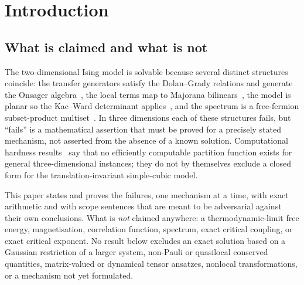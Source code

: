 \documentclass[11pt]{article}
\theoremstyle{definition}
\begin{document}
\begin{abstract}
The computational base is exact: the simple-cubic reduced free energy is computed to $v^{28}$ at high
temperature and $x^{56}$ at low temperature with per-box Chinese-remainder uniqueness certificates.
A deterministic $41{,}424$-state memory-$12$ walk automaton with an exact positive integer
Collatz certificate proves $\mu<4.747526$, and the critical coupling is therefore certified to lie in
$[0.2138368062108697304302094293879379891333,\,0.2527310098586630030260020266135701299926]$.
Every statement carries an explicit status tag, every universal claim is separated from the finite
computation that motivated it, and the withdrawn claims are listed as prominently as the proved ones.
\end{abstract}

\tableofcontents

\section{Introduction}

\subsection{What is claimed and what is not}
The two-dimensional Ising model is solvable because several distinct structures coincide: the
transfer generators satisfy the Dolan--Grady relations and generate the Onsager
algebra~\cite{dolangrady1982,davies1990_onsager,davies1991_onsager}, the local terms map to Majorana
bilinears~\cite{schultzmattisl1964}, the model is planar so the Kac--Ward determinant
applies~\cite{kacward1952}, and the spectrum is a free-fermion subset-product
multiset~\cite{onsager1944,kaufman1949}. In three dimensions each of these structures fails, but
``fails'' is a mathematical assertion that must be proved for a precisely stated mechanism, not
asserted from the absence of a known solution. Computational hardness results~\cite{istrail2000} say
that no efficiently computable partition function exists for general three-dimensional instances;
they do not by themselves exclude a closed form for the translation-invariant simple-cubic model.

This paper states and proves the failures, one mechanism at a time, with exact arithmetic and with
scope sentences that are meant to be adversarial against their own conclusions. What is
\emph{not} claimed anywhere: a thermodynamic-limit free energy, magnetisation, correlation function,
spectrum, exact critical coupling, or exact critical exponent. No result below excludes an exact
solution based on a Gaussian restriction of a larger system, non-Pauli or quasilocal conserved
quantities, matrix-valued or dynamical tensor ansatzes, nonlocal transformations, or a mechanism not
yet formulated.
\end{document}
